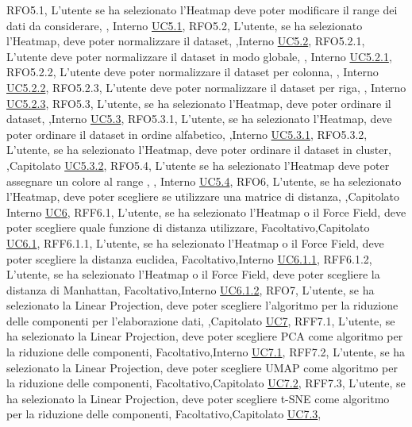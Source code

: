 {    {RFO5.1, L'utente se ha selezionato l'Heatmap deve poter modificare il range dei dati da considerare, \obb, Interno \noexpand\hyperref[uc5.1]{UC5.1}},
    {RFO5.2, L'utente{,} se ha selezionato l'Heatmap{,} deve poter normalizzare il dataset, \obb,Interno \noexpand\hyperref[uc5.2]{UC5.2}},
    {RFO5.2.1, L'utente deve poter normalizzare il dataset in modo globale, \obb, Interno \noexpand\hyperref[uc5.2.1]{UC5.2.1}},
    {RFO5.2.2, L'utente deve poter normalizzare il dataset per colonna, \obb, Interno \noexpand\hyperref[uc5.2.2]{UC5.2.2}},
    {RFO5.2.3, L'utente deve poter normalizzare il dataset per riga, \obb, Interno \noexpand\hyperref[uc5.2.3]{UC5.2.3}},
    {RFO5.3, L'utente{,} se ha selezionato l'Heatmap{,} deve poter ordinare il dataset, \obb,Interno \noexpand\hyperref[uc5.3]{UC5.3}},
    {RFO5.3.1, L'utente{,} se ha selezionato l'Heatmap{,} deve poter ordinare il dataset in ordine alfabetico, \obb,Interno \noexpand\hyperref[uc5.3.1]{UC5.3.1}},
    {RFO5.3.2, L'utente{,} se ha selezionato l'Heatmap{,} deve poter ordinare il dataset in cluster, \obb,Capitolato \noexpand\hyperref[uc5.3.2]{UC5.3.2}},
    {RFO5.4, L'utente se ha selezionato l'Heatmap deve poter assegnare un colore al range , \obb, Interno \noexpand\hyperref[uc5.4]{UC5.4}},
    {RFO6, L'utente{,} se ha selezionato l'Heatmap{,} deve poter scegliere se utilizzare una matrice di distanza, \obb,Capitolato Interno \noexpand\hyperref[uc6]{UC6}},
    {RFF6.1, L'utente{,} se ha selezionato l'Heatmap o il Force Field{,} deve poter scegliere quale funzione di distanza utilizzare, Facoltativo,Capitolato \noexpand\hyperref[uc6.1]{UC6.1}},
    {RFF6.1.1, L'utente{,} se ha selezionato l'Heatmap o il Force Field{,} deve poter scegliere la distanza euclidea, Facoltativo,Interno \noexpand\hyperref[uc6.1.1]{UC6.1.1}},
    {RFF6.1.2, L'utente{,} se ha selezionato l'Heatmap o il Force Field{,} deve poter scegliere la distanza di Manhattan, Facoltativo,Interno \noexpand\hyperref[uc6.1.2]{UC6.1.2}},
    {RFO7, L'utente{,} se ha selezionato la Linear Projection{,} deve poter scegliere l'algoritmo per la riduzione delle componenti per l'elaborazione dati, \obb,Capitolato \noexpand\hyperref[uc7]{UC7}},
    {RFF7.1, L'utente{,} se ha selezionato la Linear Projection{,} deve poter scegliere PCA come algoritmo per la riduzione delle componenti, Facoltativo,Interno \noexpand\hyperref[uc7.1]{UC7.1}},
    {RFF7.2, L'utente{,} se ha selezionato la Linear Projection{,} deve poter scegliere UMAP come algoritmo per la riduzione delle componenti, Facoltativo,Capitolato \noexpand\hyperref[uc7.2]{UC7.2}},
    {RFF7.3, L'utente{,} se ha selezionato la Linear Projection{,} deve poter scegliere t-SNE come algoritmo per la riduzione delle componenti, Facoltativo,Capitolato \noexpand\hyperref[uc7.3]{UC7.3}},
}
